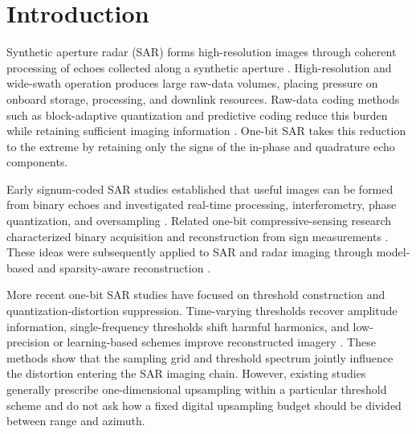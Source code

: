 \documentclass[conference]{IEEEtran}
\begin{document}
\section{Introduction}

Synthetic aperture radar (SAR) forms high-resolution images through coherent processing of echoes collected along a synthetic aperture \cite{cumming2005sar,curlander1991sar}. High-resolution and wide-swath operation produces large raw-data volumes, placing pressure on onboard storage, processing, and downlink resources. Raw-data coding methods such as block-adaptive quantization and predictive coding reduce this burden while retaining sufficient imaging information \cite{kwok1989baq,attema2010fdbaq,magli2003lossy}. One-bit SAR takes this reduction to the extreme by retaining only the signs of the in-phase and quadrature echo components.

Early signum-coded SAR studies established that useful images can be formed from binary echoes and investigated real-time processing, interferometry, phase quantization, and oversampling \cite{franceschetti1991signum,alberti1991time,cappuccino1996processor,fornaro1997interferometry,pascazio1998onebit,franceschetti1999phase}. Related one-bit compressive-sensing research characterized binary acquisition and reconstruction from sign measurements \cite{candes2008intro,boufounos2008onebit,laska2011trust,jacques2013robust}. These ideas were subsequently applied to SAR and radar imaging through model-based and sparsity-aware reconstruction \cite{dong2015map,wang2019enhanced,ge2023sparse}.

More recent one-bit SAR studies have focused on threshold construction and quantization-distortion suppression. Time-varying thresholds recover amplitude information, single-frequency thresholds shift harmful harmonics, and low-precision or learning-based schemes improve reconstructed imagery \cite{demir2018onebit,zhao2019onebit,zhao2021lowprecision,liu2023twobit,si2023dequantization,nie2025fixed}. These methods show that the sampling grid and threshold spectrum jointly influence the distortion entering the SAR imaging chain. However, existing studies generally prescribe one-dimensional upsampling within a particular threshold scheme and do not ask how a fixed digital upsampling budget should be divided between range and azimuth.
\end{document}
